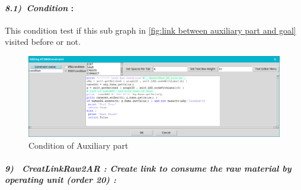 \paragraph{\emph{8.1)~Condition } : }
This condition test if this sub graph in \ref{fig:link between auxiliary part and goal} visited before or not.
 
\vspace{1cm}
 
\begin{figure}[th]
	\centering
 	\includegraphics[scale=0.37]{ch3/img/condaux}
	\caption{\label{fig:Condition of Auxiliary part}Condition of Auxiliary part }
\end{figure} 


\paragraph{\emph{9)~ CreatLinkRaw2AR : Create link to consume the raw material by operating unit (order 20) :} }
 
